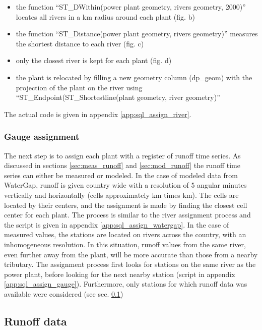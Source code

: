 \begin{itemize}
 \item the function ``ST{\_}DWithin(power plant geometry, rivers geometry, 2000)'' locates all rivers in a \unit[2]{km} radius around each plant (fig. b)
 \item the function ``ST{\_}Distance(power plant geometry, rivers geometry)'' measures the  shortest distance to each river (fig. c)
 \item only the closest river is kept for each plant (fig. d)
 \item the plant is relocated by filling a new geometry column (dp{\_}geom) with the projection of the plant on the river using ``ST{\_}Endpoint(ST{\_}Shortestline(plant geometry, river geometry)''
\end{itemize}
The actual code is given in appendix \ref{app:sql_assign_river}.

\subsubsection*{Gauge assignment}
The next step is to assign each plant with a register of runoff time series. As discussed in sections \ref{sec:meas_runoff} and \ref{sec:mod_runoff} the runoff time series can either be measured or modeled. \newline
In the case of modeled data from WaterGap, runoff is given country wide with a resolution of 5 angular minutes vertically and horizontally (cells approximately \unit[9]{km} times \unit[6]{km}). The cells are located by their centers, and the assignment is made by finding the closest cell center for each plant. The process is similar to the river assignment process and the script is given in appendix \ref{app:sql_assign_watergap}. \newline
In the case of measured values, the stations are located on rivers across the country, with an inhomogeneous resolution. In this situation, runoff values from the same river, even further away from the plant, will be more accurate than those from a nearby tributary. The assignment process first looks for stations on the same river as the power plant, before looking for the next nearby station (script in appendix \ref{app:sql_assign_gauge}). Furthermore, only stations for which runoff data was available were considered (see sec. \ref{sec:runoff_data})

\subsection{Runoff data}
\label{sec:runoff_data}

